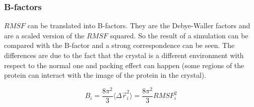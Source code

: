 		\subsubsection{B-factors}
		$RMSF$ can be translated into B-factors.
		They are the Debye-Waller factors and are a scaled version of the $RMSF$ squared.
		So the result of a simulation can be compared with the B-factor and a strong correspondence can be seen.
		The differences are due to the fact that the crystal is a different environment with respect to the normal one and packing effect can happen (some regions of the protein can interact with the image of the protein in the crystal).

		$$B_i = \frac{8\pi^2}{3}\langle\Delta\vec{r}_i^2\rangle = \frac{8\pi^2}{3}RMSF^2_i$$
